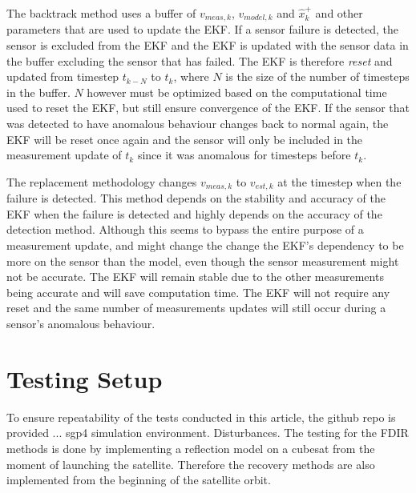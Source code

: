 \documentclass[letterpaper, 10 pt, conference]{ieeeconf}  %
\begin{document}
The backtrack method uses a buffer of $v_{meas,k}$, $v_{model,k}$ and $\hat{x}_k^+$ and other parameters that are used to update the EKF. If a sensor failure is detected, the sensor is excluded from the EKF and the EKF is updated with the sensor data in the buffer excluding the sensor that has failed. The EKF is therefore \emph{reset} and updated from timestep $t_{k-N}$ to $t_k$, where $N$ is the size of the number of timesteps in the buffer. $N$ however must be optimized based on the computational time used to reset the EKF, but still ensure convergence of the EKF. If the sensor that was detected to have anomalous behaviour changes back to normal again, the EKF will be reset once again and the sensor will only be included in the measurement update of $t_k$ since it was anomalous for timesteps before $t_k$.

The replacement methodology changes $v_{meas,k}$ to $v_{est,k}$ at the timestep when the failure is detected. This method depends on the stability and accuracy of the EKF when the failure is detected and highly depends on the accuracy of the detection method. Although this seems to bypass the entire purpose of a measurement update, and might change the change the EKF's dependency to be more on the sensor than the model, even though the sensor measurement might not be accurate. The EKF will remain stable due to the other measurements being accurate and will save computation time. The EKF will not require any reset and the same number of measurements updates will still occur during a sensor's anomalous behaviour.
%
%		
%	

\section{Testing Setup}
To ensure repeatability of the tests conducted in this article, the github repo is provided ...
sgp4 simulation environment. Disturbances. The testing for the FDIR methods is done by implementing a reflection model on a cubesat from the moment of launching the satellite. Therefore the recovery methods are also implemented from the beginning of the satellite orbit. 
\end{document}
